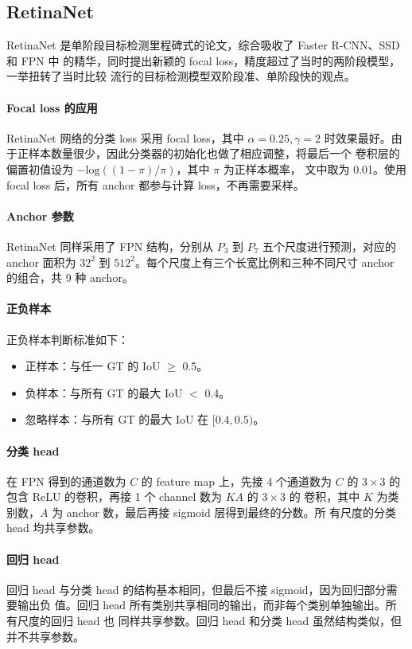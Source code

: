 \subsection{RetinaNet}
\label{sub:RetinaNet}

RetinaNet 是单阶段目标检测里程碑式的论文，综合吸收了 Faster R-CNN、SSD 和 FPN 中
的精华，同时提出新颖的 focal loss，精度超过了当时的两阶段模型，一举扭转了当时比较
流行的目标检测模型双阶段准、单阶段快的观点。

\paragraph{Focal loss 的应用}
RetinaNet 网络的分类 loss 采用 focal loss，其中 $\alpha = 0.25, \gamma
= 2$ 时效果最好。由于正样本数量很少，因此分类器的初始化也做了相应调整，将最后一个
卷积层的偏置初值设为 $-\mathrm{log}((1 - \pi)/ \pi)$，其中 $\pi$ 为正样本概率，
文中取为 0.01。使用 focal loss 后，所有 anchor 都参与计算 loss，不再需要采样。

\paragraph{Anchor 参数}
RetinaNet 同样采用了 FPN 结构，分别从 $P_3$ 到 $P_7$ 五个尺度进行预测，对应的
anchor 面积为 $32^2$ 到 $512^2$。每个尺度上有三个长宽比例和三种不同尺寸 anchor
的组合，共 9 种 anchor。

\paragraph{正负样本}
正负样本判断标准如下：
\begin{itemize}
  \item 正样本：与任一 GT 的 IoU $\geq$ 0.5。
  \item 负样本：与所有 GT 的最大 IoU $ < $ 0.4。
  \item 忽略样本：与所有 GT 的最大 IoU 在 $[0.4, 0.5)$。
\end{itemize}

\paragraph{分类 head}
在 FPN 得到的通道数为 $C$ 的 feature map 上，先接 4 个通道数为 $C$ 的
$3 \times 3$ 的包含 ReLU 的卷积，再接 1 个 channel 数为 $KA$ 的 $3 \times 3$ 的
卷积，其中 $K$ 为类别数，$A$ 为 anchor 数，最后再接 sigmoid 层得到最终的分数。所
有尺度的分类 head 均共享参数。

\paragraph{回归 head}
回归 head 与分类 head 的结构基本相同，但最后不接 sigmoid，因为回归部分需要输出负
值。回归 head 所有类别共享相同的输出，而非每个类别单独输出。所有尺度的回归 head 也
同样共享参数。回归 head 和分类 head 虽然结构类似，但并不共享参数。

